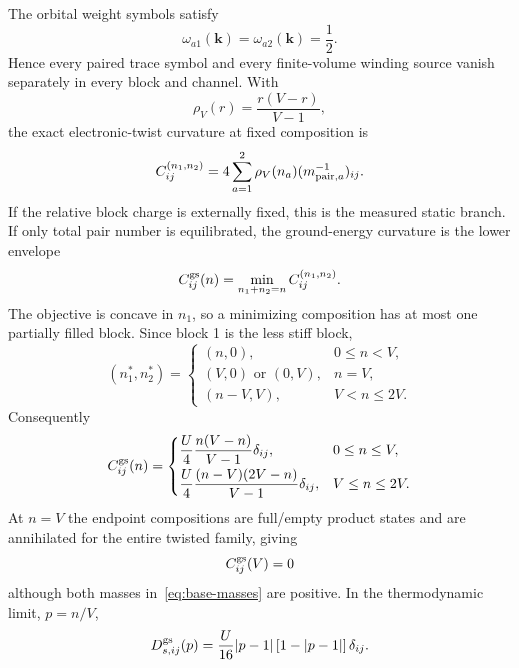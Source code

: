 \documentclass[11pt]{article}
\theoremstyle{remark}
\newcommand{\bmk}{\bm k}
\begin{document}
The orbital weight symbols satisfy
\begin{equation}
\omega_{a1}(\bmk)=\omega_{a2}(\bmk)=\frac12.
\end{equation}
Hence every paired trace symbol and every finite-volume winding source vanish separately in every block and channel.  With
\begin{equation}
\rho_V(r)=\frac{r(V-r)}{V-1},
\end{equation}
the exact electronic-twist curvature at fixed composition is
\begin{equation}
C_{ij}^{(n_1,n_2)}
=4\sum_{a=1}^2\rho_V(n_a)
(m^{-1}_{{\rm pair},a})_{ij}.
\label{eq:fixed-composition-curvature}
\end{equation}
If the relative block charge is externally fixed, this is the measured static branch.  If only total pair number is equilibrated, the ground-energy curvature is the lower envelope
\begin{equation}
C_{ij}^{\rm gs}(n)=
\min_{n_1+n_2=n}C_{ij}^{(n_1,n_2)}.
\label{eq:equilibrium-envelope}
\end{equation}
The objective is concave in $n_1$, so a minimizing composition has at most one partially filled block.  Since block 1 is the less stiff block,
\begin{equation}
(n_1^*,n_2^*)=
\begin{cases}
(n,0),&0\le n<V,\\
(V,0)\text{ or }(0,V),&n=V,\\
(n-V,V),&V<n\le2V.
\end{cases}
\end{equation}
Consequently
\begin{equation}
C_{ij}^{\rm gs}(n)=
\begin{cases}
\displaystyle\frac U4\frac{n(V-n)}{V-1}\delta_{ij},&0\le n\le V,\\[2mm]
\displaystyle\frac U4\frac{(n-V)(2V-n)}{V-1}\delta_{ij},&V\le n\le2V.
\end{cases}
\label{eq:base-envelope-finite}
\end{equation}
At $n=V$ the endpoint compositions are full/empty product states and are annihilated for the entire twisted family, giving
\begin{equation}
C_{ij}^{\rm gs}(V)=0
\end{equation}
although both masses in~\eqref{eq:base-masses} are positive.  In the thermodynamic limit, $p=n/V$,
\begin{equation}
D_{s,ij}^{\rm gs}(p)=
\frac U{16}|p-1|\,[1-|p-1|]\,\delta_{ij}.
\label{eq:base-thermo-envelope}
\end{equation}
\end{document}
